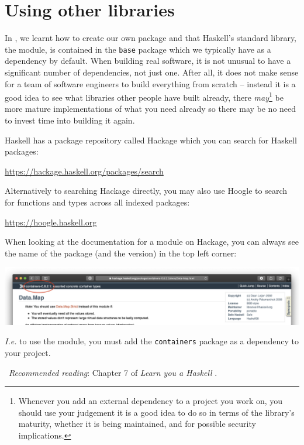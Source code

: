 \section{Using other libraries}

In , we learnt how to create our own package and that Haskell's standard library, the  module, is contained in the \texttt{\small base} package which we typically have as a dependency by default. When building real software, it is not unusual to have a significant number of dependencies, not just one. After all, it does not make sense for a team of software engineers to build everything from scratch -- instead it is a good idea to see what libraries other people have built already, there \emph{may}\footnote{Whenever you add an external dependency to a project you work on, you should use your judgement it is a good idea to do so in terms of the library's maturity, whether it is being maintained, and for possible security implications.} be more mature implementations of what you need already so there may be no need to invest time into building it again.

Haskell has a package repository called Hackage which you can search for Haskell packages:
\begin{center}\small
	\url{https://hackage.haskell.org/packages/search}
\end{center}
Alternatively to searching Hackage directly, you may also use Hoogle to search for functions and types across all indexed packages:
\begin{center}\small
	\url{https://hoogle.haskell.org}
\end{center}
When looking at the documentation for a module on Hackage, you can always see the name of the package (and the version) in the top left corner:
\begin{center}
	\includegraphics[width=\textwidth]{labs/hackage.png}
\end{center}
\emph{I.e.} to use the  module, you must add the \texttt{\small containers} package as a dependency to your project.

\makebox[0.5cm]{\faBook}~\emph{Recommended reading}: Chapter 7 of \emph{Learn you a Haskell} \citep{lipovaca2011learn}.

